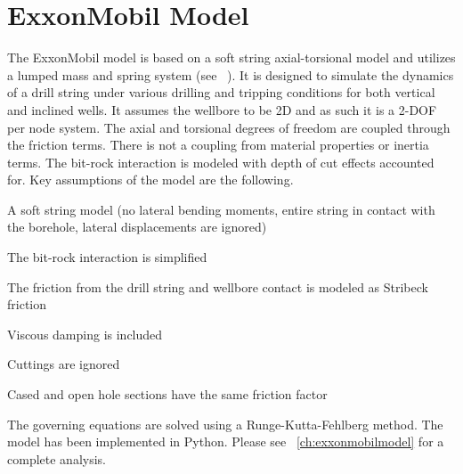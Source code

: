 \section{ExxonMobil Model}
The ExxonMobil model is based on a soft string axial-torsional model and utilizes a lumped mass and spring system (see ~\cite{ref:dixit2021a}). It is designed to simulate the dynamics of a drill string under various drilling and tripping conditions for both vertical and inclined wells. It assumes the wellbore to be 2D and as such it is a 2-DOF per node system. The axial and torsional degrees of freedom are coupled through the friction terms. There is not a coupling from material properties or inertia terms.  The bit-rock interaction is modeled with depth of cut effects accounted for.  Key assumptions of the model are the following.
\begin{bulletedlist}
	\item A soft string model (no lateral bending moments, entire string in contact with the borehole, lateral displacements are ignored)
	\item The bit-rock interaction is simplified
	\item The friction from the drill string and wellbore contact is modeled as Stribeck friction
    \item Viscous damping is included
    \item Cuttings are ignored
    \item Cased and open hole sections have the same friction factor
\end{bulletedlist}

The governing equations are solved using a Runge-Kutta-Fehlberg method. The model has been implemented in Python.  Please see \chaptername~\ref{ch:exxonmobilmodel} for a complete analysis. 